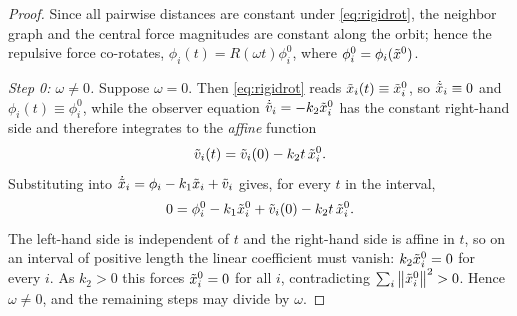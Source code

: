\begin{proof}
Since all pairwise distances are constant under \eqref{eq:rigidrot}, the neighbor graph and the
central force magnitudes are constant along the orbit; hence the repulsive force co-rotates,
$\phi_i(t)=R(\omega t)\phi_i^0$, where $\phi_i^0=\phi_i(\tilde{x}^0)$.

\emph{Step 0: $\omega\ne0$.} Suppose $\omega=0$. Then \eqref{eq:rigidrot} reads
$\tilde{x}_i(t)\equiv\tilde{x}_i^0$, so $\dot{\tilde{x}}_i\equiv0$ and $\phi_i(t)\equiv\phi_i^0$, while the observer
equation $\dot{\tilde{v}}_i=-k_2\tilde{x}_i^0$ has the constant right-hand side and therefore integrates to
the \emph{affine} function
\begin{equation}
  \tilde{v}_i(t)=\tilde{v}_i(0)-k_2t\,\tilde{x}_i^0 .
  \label{eq:omega0_vel}
\end{equation}
Substituting into $\dot{\tilde{x}}_i=\phi_i-k_1\tilde{x}_i+\tilde{v}_i$ gives, for every $t$ in the interval,
\begin{equation}
  0=\phi_i^0-k_1\tilde{x}_i^0+\tilde{v}_i(0)-k_2t\,\tilde{x}_i^0 .
\end{equation}
The left-hand side is independent of $t$ and the right-hand side is affine in $t$, so on an interval of
positive length the linear coefficient must vanish: $k_2\tilde{x}_i^0=0$ for every $i$. As $k_2>0$ this
forces $\tilde{x}_i^0=0$ for all $i$, contradicting $\sum_i\left\| \tilde{x}_i^0 \right\|^2>0$. Hence $\omega\ne0$, and the
remaining steps may divide by $\omega$.


\end{proof}
